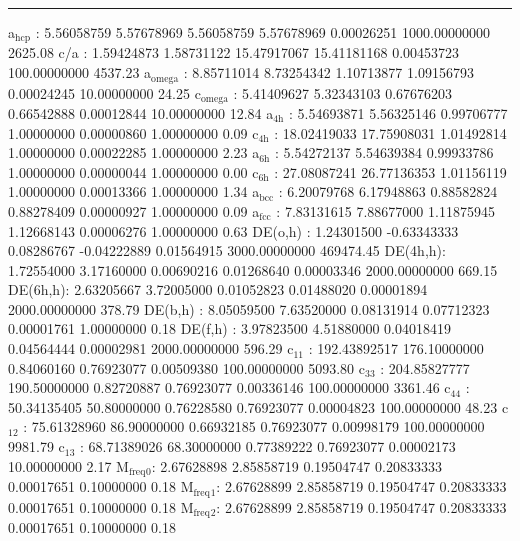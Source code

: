 \documentclass[11pt]{article}
\begin{document}
\noindent\rule{\textwidth}{0.5pt}
a\(_{\text{hcp}}\)   :   5.56058759   5.57678969   5.56058759   5.57678969   0.00026251 1000.00000000      2625.08
c/a     :   1.59424873   1.58731122  15.47917067  15.41181168   0.00453723 100.00000000      4537.23
a\(_{\text{omega}}\) :   8.85711014   8.73254342   1.10713877   1.09156793   0.00024245  10.00000000        24.25
c\(_{\text{omega}}\) :   5.41409627   5.32343103   0.67676203   0.66542888   0.00012844  10.00000000        12.84
a\(_{\text{4h}}\)    :   5.54693871   5.56325146   0.99706777   1.00000000   0.00000860   1.00000000         0.09
c\(_{\text{4h}}\)    :  18.02419033  17.75908031   1.01492814   1.00000000   0.00022285   1.00000000         2.23
a\(_{\text{6h}}\)    :   5.54272137   5.54639384   0.99933786   1.00000000   0.00000044   1.00000000         0.00
c\(_{\text{6h}}\)    :  27.08087241  26.77136353   1.01156119   1.00000000   0.00013366   1.00000000         1.34
a\(_{\text{bcc}}\)   :   6.20079768   6.17948863   0.88582824   0.88278409   0.00000927   1.00000000         0.09
a\(_{\text{fcc}}\)   :   7.83131615   7.88677000   1.11875945   1.12668143   0.00006276   1.00000000         0.63
DE(o,h) :   1.24301500  -0.63343333   0.08286767  -0.04222889   0.01564915 3000.00000000    469474.45
DE(4h,h):   1.72554000   3.17160000   0.00690216   0.01268640   0.00003346 2000.00000000       669.15
DE(6h,h):   2.63205667   3.72005000   0.01052823   0.01488020   0.00001894 2000.00000000       378.79
DE(b,h) :   8.05059500   7.63520000   0.08131914   0.07712323   0.00001761   1.00000000         0.18
DE(f,h) :   3.97823500   4.51880000   0.04018419   0.04564444   0.00002981 2000.00000000       596.29
c\(_{\text{11}}\)    : 192.43892517 176.10000000   0.84060160   0.76923077   0.00509380 100.00000000      5093.80
c\(_{\text{33}}\)    : 204.85827777 190.50000000   0.82720887   0.76923077   0.00336146 100.00000000      3361.46
c\(_{\text{44}}\)    :  50.34135405  50.80000000   0.76228580   0.76923077   0.00004823 100.00000000        48.23
c\(_{\text{12}}\)    :  75.61328960  86.90000000   0.66932185   0.76923077   0.00998179 100.00000000      9981.79
c\(_{\text{13}}\)    :  68.71389026  68.30000000   0.77389222   0.76923077   0.00002173  10.00000000         2.17
M\(_{\text{freq}}\)\(_{\text{0}}\):   2.67628898   2.85858719   0.19504747   0.20833333   0.00017651   0.10000000         0.18
M\(_{\text{freq}}\)\(_{\text{1}}\):   2.67628899   2.85858719   0.19504747   0.20833333   0.00017651   0.10000000         0.18
M\(_{\text{freq}}\)\(_{\text{2}}\):   2.67628899   2.85858719   0.19504747   0.20833333   0.00017651   0.10000000         0.18
\end{document}
